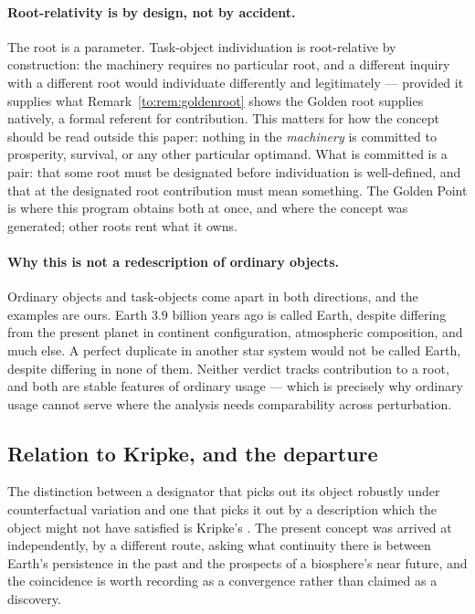 \documentclass[11pt]{article}
\numberwithin{equation}{section}
\theoremstyle{plain}
\theoremstyle{definition}
\theoremstyle{remark}
\begin{document}
\paragraph{Root-relativity is by design, not by accident.}\label{to:rem:rootrelative}
The root is a parameter. Task-object individuation is root-relative by
construction: the machinery requires no particular root, and a
different inquiry with a different root would individuate differently
and legitimately --- provided it supplies what
Remark~\ref{to:rem:goldenroot} shows the Golden root supplies
natively, a formal referent for contribution. This matters for how the
concept should be read outside this paper: nothing in the
\emph{machinery} is committed to prosperity, survival, or any other
particular optimand. What is committed is a pair: that some root must
be designated before individuation is well-defined, and that at the
designated root contribution must mean something. The Golden Point is
where this program obtains both at once, and where the concept was
generated; other roots rent what it owns.

\paragraph{Why this is not a redescription of ordinary objects.}\label{to:rem:notredescription}
Ordinary objects and task-objects come apart in both directions, and the
examples are ours. Earth $3.9$ billion years ago is called
Earth, despite differing from the present planet in continent
configuration, atmospheric composition, and much else. A perfect
duplicate in another star system would not be called Earth, despite
differing in none of them. Neither verdict tracks contribution to a
root, and both are stable features of ordinary usage --- which is
precisely why ordinary usage cannot serve where the analysis needs
comparability across perturbation.

\subsection{Relation to Kripke, and the departure}\label{to:sub:kripke}

The distinction between a designator that picks out its object robustly
under counterfactual variation and one that picks it out by a
description which the object might not have satisfied is Kripke's
\cite{kripke1980naming}. The present concept was arrived at independently, by a
different route, asking what continuity there is between Earth's
persistence in the past and the prospects of a biosphere's near future, and the coincidence is worth recording as a convergence rather than
claimed as a discovery.
\end{document}
